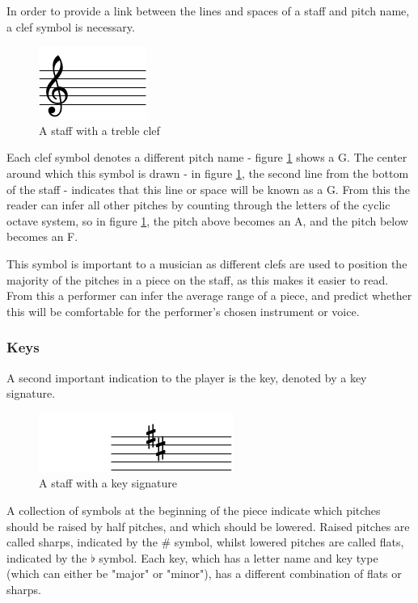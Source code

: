 In order to provide a link between the lines and spaces of a staff and pitch name, a clef symbol is necessary.
\begin{figure}[h]
    \centering
        \includegraphics{clef-crop.pdf}
    \caption{A staff with a treble clef}
    \label{fig:clef}
\end{figure}

Each clef symbol denotes a different pitch name - figure \ref{fig:clef} shows a G. The center around which this symbol is drawn - in figure \ref{fig:clef}, the second line from the bottom of the staff - indicates that this line or space will be known as a G. From this the reader can infer all other pitches by counting through the letters of the cyclic octave system, so in figure \ref{fig:clef}, the pitch above becomes an A, and the pitch below becomes an F.

This symbol is important to a musician as different clefs are used to position the majority of the pitches in a piece on the staff, as this makes it easier to read. From this a performer can infer the average range of a piece, and predict whether this will be comfortable for the performer's chosen instrument or voice.

\subsubsection{Keys}
A second important indication to the player is the key, denoted by a key signature.
\begin{figure}[h]
    \centering
        \includegraphics{key-crop.pdf}
    \caption{A staff with a key signature}
    \label{fig:key}
\end{figure}

A collection of symbols at the beginning of the piece indicate which pitches should be raised by half pitches, and which should be lowered. Raised pitches are called sharps, indicated by the \# symbol, whilst lowered pitches are called flats, indicated by the $\flat$ symbol. Each key, which has a letter name and key type (which can either be "major" or "minor"), has a different combination of flats or sharps. 

